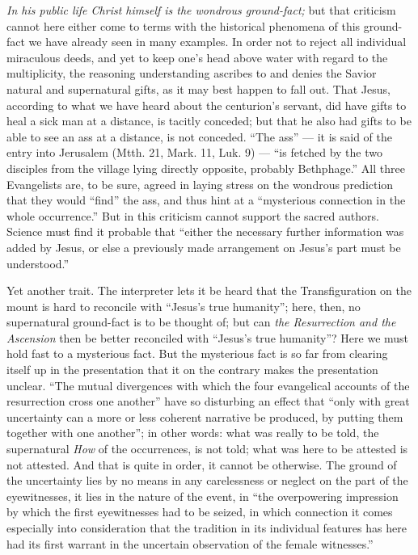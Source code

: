 \documentclass[12pt,a4paper,openany]{book}
\newcommand{\opage}[1]{\marginnote{\footnotesize\textit{[#1]}}}
\begin{document}
\emph{In his public life Christ himself is the wondrous
ground-fact;} but that criticism cannot here either
come to terms with the historical phenomena
of this ground-fact we have already seen in
many examples. In order not to reject all individual
miraculous deeds, and yet to keep one's head above water with regard to the multiplicity,
the reasoning understanding ascribes to and denies the Savior natural and supernatural gifts, as
it may best happen to fall out. That Jesus, according to what we have
heard about the centurion's servant, did have gifts
to heal a sick man at a distance, is tacitly conceded;
but that he also had gifts to be able to
see an ass at a distance, is not conceded. ``The ass''
--- it is said of the entry into Jerusalem (Mtth. 21,
Mark. 11, Luk. 9) --- ``is fetched by the two disciples
from the village lying directly opposite, probably Bethphage.''
All three Evangelists are, to be sure, agreed
in laying stress on the wondrous prediction that
they would ``find'' the ass, and thus hint at a ``mysterious
connection in the whole occurrence.'' But in this
criticism cannot support the sacred authors.
Science must find it probable that ``either
the necessary further information was added by
Jesus, or else a previously made arrangement on Jesus's part must
be understood.''

Yet another trait. The interpreter lets it be heard
that the Transfiguration on the mount is hard to reconcile with
``Jesus's true humanity''; here, then, no supernatural
ground-fact is to be thought of; but can
\setcounter{footnote}{0}%
\opage{312}\emph{the Resurrection and the Ascension} then be better reconciled
with ``Jesus's true humanity''? Here we must hold
fast to a mysterious fact. But the mysterious
fact is so far from clearing itself up in the presentation
that it on the contrary makes the presentation unclear. ``The mutual
divergences with which the four evangelical accounts
of the resurrection cross one another'' have
so disturbing an effect that ``only with great uncertainty
can a more or less coherent narrative be produced,
by putting them together with one another'';
in other words: what was really to be told, the supernatural
\emph{How} of the occurrences, is not told;
what was here to be attested is not attested.
And that is quite in order, it cannot be otherwise.
The ground of the uncertainty lies by no means in
any carelessness or neglect on the part of the eyewitnesses,
it lies in the nature of the event, in ``the overpowering
impression by which the first eyewitnesses had to be seized,
in which connection it comes especially into consideration that the tradition
in its individual features has here had its first warrant in
the uncertain observation of the female witnesses.''
\end{document}
